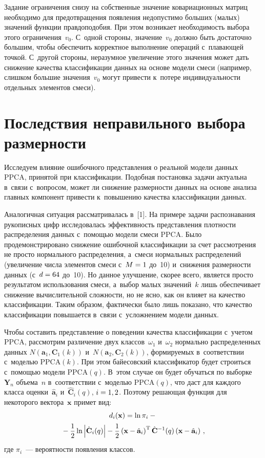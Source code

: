 \begin{multicols}{2}
     Задание ограничения снизу на собственные значение ковариационных 
матриц необходимо для предотвращения появления недопустимо больших 
(малых) значений функции правдоподобия. При этом возникает необходимость 
выбора этого ограничения~$v_0$. С~одной стороны, значение~$v_0$ должно 
быть достаточно большим, чтобы обеспечить корректное выполнение операций 
с~плавающей точкой. С~другой стороны, неразумное увеличение этого 
значения может дать снижение качества классификации данных на основе 
модели смеси (например, слишком большие значения~$v_0$ могут привести 
к~потере индивидуальности отдельных элементов смеси).
     
\section{Последствия неправильного выбора размерности}

     Исследуем влияние ошибочного представления о реальной модели 
данных PPCA, принятой при классификации. Подобная постановка задачи 
актуальна в~связи с~вопросом, может ли снижение размерности данных на 
основе анализа главных компонент привести к~повышению качества 
классификации данных.
     
     Аналогичная ситуация рассматривалась в~[1]. На примере задачи 
распознавания рукописных цифр исследовалась эффективность представления 
плотности распределения данных с~помощью модели смеси PPCA. Было 
продемонстрировано снижение ошибочной классификации за счет 
рассмотрения не просто нормального распределения, а~смеси нормальных 
распределений (увеличение числа элементов смеси с~$M\hm=1$ 
до~10) и~снижения размерности данных (с~$d\hm=64$ 
до~10). Но данное улучшение, скорее всего, является просто 
результатом использования смеси, а~выбор малых значений~$k$ лишь 
обеспечивает снижение вычислительной слож\-ности, но не ясно, как он влияет 
на качество классификации. Таким образом, фактически было лишь показано, 
что качество классификации повышается в~связи с~усложнением модели 
данных.
     
     Чтобы составить представление о поведении качества классификации 
с~учетом PPCA, рассмотрим различение двух классов~$\omega_1$ 
и~$\omega_2$ нормально распределенных данных $N(\mathbf{a}_1, 
\mathbf{C}_1(k))$ и~$N(\mathbf{a}_2, \mathbf{C}_2(k))$, формируемых 
в~соответствии с~моделью PPCA$(k)$. При этом байесовский классификатор 
будет строиться с~помощью модели PPCA$(q)$. В~этом случае он будет 
обучаться по выборке~$\mathbf{Y}_n$ объема~$n$ в~соответствии с~моделью 
PPCA$(q)$, что даст для каждого класса оценки~$\hat{\mathbf{a}}_i$ 
и~$\hat{\mathbf{C}}_i(q)$, $i\hm=1,2$. Поэтому решающая функция для 
некоторого вектора~$\mathbf{x}$ примет вид:
    \begin{multline*}
     d_i(\mathbf{x})=\ln \pi_i -{}\\
     {}-\displaystyle\frac{\displaystyle 1\mathstrut}{\displaystyle 2\mathstrut}\ln \left\vert 
\hat{\mathbf{C}}_i(q)\right\vert -\displaystyle\frac{\displaystyle 1\mathstrut}{\displaystyle 2\mathstrut}\left( \mathbf{x}-
\hat{\mathbf{a}}_i\right)^{\mathrm{T}}\hat{\mathbf{C}}^{-1}(q) \left( \mathbf{x}-
\hat{\mathbf{a}}_i\right)\,,
\end{multline*}
где $\pi_i$~--- вероятности появления классов.


\end{multicols}
